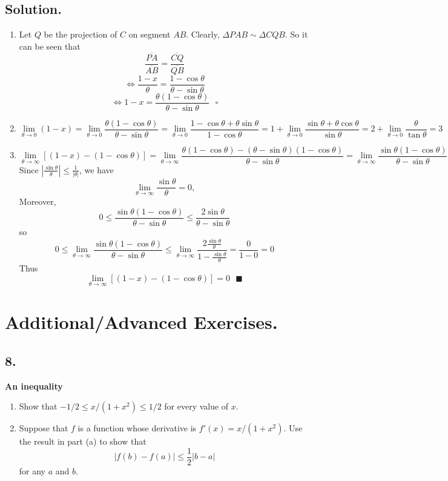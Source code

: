 \documentclass{article}
\begin{document}
\subsection*{Solution.}
\begin{enumerate}[label=\textbf{\alph*.}]
    \item Let $Q$ be the projection of $C$ on segment $AB$.
    Clearly, $\Delta PAB\sim \Delta CQB$. So it can be seen that
    \[\frac{\overline{PA}}{\overline{AB}}=\frac{\overline{CQ}}{\overline{QB}}\]
    \[\Leftrightarrow \frac{1-x}{\theta}=\frac{1-\cos\theta }{\theta-\sin\theta}\]
    \[\Leftrightarrow 1-x=\frac{\theta(1-\cos\theta)}{\theta-\sin\theta}\text{     }\square\]
    \item 
    \[\lim_{\theta\to 0} (1-x)=\lim_{\theta\to 0} \frac{\theta(1-\cos\theta)}{\theta-\sin\theta}=\lim_{\theta\to 0} \frac{1-\cos\theta+\theta\sin\theta}{1-\cos\theta}=1+\lim_{\theta\to 0} \frac{\sin\theta+\theta\cos\theta}{\sin\theta}=2+\lim_{\theta\to 0} \frac{\theta}{\tan\theta}=3\]
    \item 
    \[\lim_{\theta\to\infty}[(1-x)-(1-\cos\theta)]=\lim_{\theta\to\infty}\frac{\theta(1-\cos\theta)-(\theta-\sin\theta)(1-\cos\theta)}{\theta-\sin\theta}=\lim_{\theta\to\infty} \frac{\sin\theta(1-\cos\theta)}{\theta-\sin\theta}\]
    Since $|\frac{\sin\theta}{\theta}|\leq \frac{1}{|\theta|}$, we have 
    \[\lim _{\theta\to\infty}\frac{\sin\theta}{\theta}=0,\]
    Moreover,
    \[0\leq\frac{\sin\theta(1-\cos\theta)}{\theta-\sin\theta}\leq \frac{2\sin\theta}{\theta-\sin\theta}\]
    so
    \[0\leq\lim_{\theta\to\infty} \frac{\sin\theta(1-\cos\theta)}{\theta-\sin\theta}\leq\lim_{\theta\to\infty} \frac{2\frac{\sin\theta}{\theta}}{1-\frac{\sin\theta}{\theta}}=\frac{0}{1-0}=0\]
    Thus
    \[\lim _{\theta \to \infty} [(1-x)-(1-\cos\theta)]=0 \text{     } \blacksquare\]
\end{enumerate}
\section*{Additional/Advanced Exercises.}
\subsection*{8.}
\textbf{An inequality} 
\begin{enumerate}[label=\textbf{\alph*.}]
    \item Show that $-1/2\leq x/(1+x^2)\leq 1/2$ for every value of $x$.
    \item Suppose that $f$ is a function whose derivative is $f'(x)=x/(1+x^2)$. Use the result in part (a) to show that \[|f(b)-f(a)|\leq \frac{1}{2}|b-a|\]
    for any $a$ and $b$.
\end{enumerate}
\end{document}
